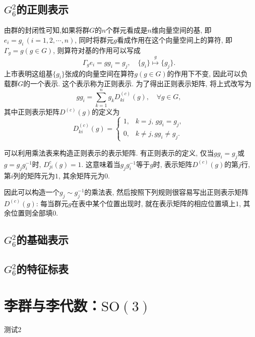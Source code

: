 \documentclass[UTF8]{ctexart}
\begin{document}
\subsection{$G_6^2$的正则表示}
由群的封闭性可知,如果将群$G$的$n$个群元看成是$n$维向量空间的基, 即$e_i = g_i \, (i = 1, 2, \cdots, n)$, 同时将群元$g$看成作用在这个向量空间上的算符, 即$\varGamma_g = g (g \in G)$, 则算符对基的作用可以写成
\begin{equation}
  \varGamma_g e_i = g g_i = g_j, \quad \{g_i\} \stackrel{g}{\mapsto} \{g_j\}.
\end{equation}
上市表明这组基$\{g_i\}$张成的向量空间在算符$g(g \in G)$的作用下不变, 因此可以负载群$G$的一个表示. 这个表示称为正则表示. 为了得出正则表示矩阵, 将上式改写为
\begin{equation}
  gg_i = \sum_{k = 1}^{n} g_k D_{ki}^{(c)} (g), \quad \forall g \in G, 
\end{equation}
其中正则表示矩阵$D^{(c)}(g)$的定义为
\begin{equation}
  D_{ki}^{(c)} (g) =
  \begin{cases}
    1, & k = j, \, gg_i = g_j,\\
    0, & k \neq j, gg_i \neq g_j.
  \end{cases}
\end{equation}

可以利用乘法表来构造正则表示的表示矩阵. 有正则表示的定义, 仅当$gg_i = g_j$或$g = g_j g_i^{-1}$时, $D_{ji}^{c} (g) = 1$. 这意味着当$g_j g_i^{-1}$等于$g$时, 表示矩阵$D^{(c)}(g)$的第$j$行, 第$i$列的矩阵元为$1$, 其余矩阵元为$0$.

因此可以构造一个$g_j \sim g_j^{-1}$的乘法表, 然后按照下列规则很容易写出正则表示矩阵$D^{(c)}(g)$: 每当群元$g$在表中某个位置出现时, 就在表示矩阵的相应位置填上$1$, 其余位置则全部填$0$.
\subsection{$G_6^2$的基础表示}

\subsection{$G_6^2$的特征标表}

\section{李群与李代数：$\mathrm{SO}(3)$}
测试2
\end{document}
